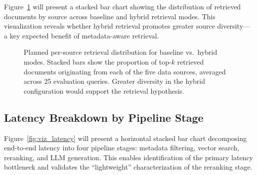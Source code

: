 \documentclass[12pt,a4paper]{report}
\begin{document}
Figure~\ref{fig:viz_sources} will present a stacked bar chart showing the distribution of retrieved documents by source across baseline and hybrid retrieval modes. This visualization reveals whether hybrid retrieval promotes greater source diversity---a key expected benefit of metadata-aware retrieval.

\begin{figure}[H]
\centering
{}
\caption{Planned per-source retrieval distribution for baseline vs.\ hybrid modes. Stacked bars show the proportion of top-$k$ retrieved documents originating from each of the five data sources, averaged across 25 evaluation queries. Greater diversity in the hybrid configuration would support the retrieval hypothesis.}
\label{fig:viz_sources}
\end{figure}

\subsection{Latency Breakdown by Pipeline Stage}

Figure~\ref{fig:viz_latency} will present a horizontal stacked bar chart decomposing end-to-end latency into four pipeline stages: metadata filtering, vector search, reranking, and LLM generation. This enables identification of the primary latency bottleneck and validates the ``lightweight'' characterization of the reranking stage.
\end{document}

